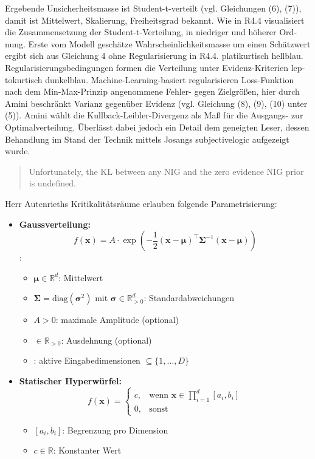 \begin{otherlanguage}{ngerman}
Ergebende Unsicherheitsmasse ist Student-t-verteilt (vgl. Gleichungen (6), (7)), damit ist Mittelwert, Skalierung, Freiheitsgrad bekannt. Wie in R4.4 visualisiert die Zusammensetzung der Student-t-Verteilung, in \glqq niedriger \grqq und \glqq höherer \grqq Ordnung. Erste vom Modell geschätze Wahrscheinlichkeitsmasse um einen Schätzwert ergibt sich aus Gleichung 4 ohne Regularisierung in R4.4. platikurtisch hellblau. Regularisierungsbedingungen formen die Verteilung unter Evidenz-Kriterien leptokurtisch dunkelblau. Machine-Learning-basiert regularisieren Loss-Funktion nach dem Min-Max-Prinzip angenommene Fehler- gegen Zielgrößen, hier durch Amini beschränkt Varianz gegenüber Evidenz (vgl. Gleichung (8), (9), (10) unter (5)). Amini wählt die Kullback-Leibler-Divergenz als Maß für die Ausgangs- zur Optimalverteilung. Überlässt dabei jedoch ein Detail dem geneigten Leser, dessen Behandlung im Stand der Technik mittels Josangs \gls{subjectivelogic} aufgezeigt wurde.

\begin{quote}
  Unfortunately, the KL between any NIG and the zero evidence NIG prior is undefined.
\end{quote}

Herr Autenrieths Kritikalitätsräume erlauben folgende Parametrisierung: 

\begin{itemize}
  \item \textbf{Gaussverteilung:}
    \[
    f(\mathbf{x}) = A \cdot \exp\left(-\frac{1}{2} (\mathbf{x} - \boldsymbol{\mu})^\top \mathbf{\Sigma}^{-1} (\mathbf{x} - \boldsymbol{\mu}) \right)
    \]
    :
    \begin{itemize}
      \item $\boldsymbol{\mu} \in \mathbb{R}^d$: Mittelwert
      \item $\mathbf{\Sigma} = \mathrm{diag}(\boldsymbol{\sigma}^2)$ mit $\boldsymbol{\sigma} \in \mathbb{R}_{>0}^d$: Standardabweichungen
      \item $A > 0$: maximale Amplitude (optional)
      \item {} $\in \mathbb{R}_{>0}$: Ausdehnung (optional)
      \item {}: aktive Eingabedimensionen $\subseteq \{1, \dots, D\}$
    \end{itemize}

  \item \textbf{Statischer Hyperwürfel:}
    \[
    f(\mathbf{x}) =
    \begin{cases}
      c, & \text{wenn } \mathbf{x} \in \prod_{i=1}^d [a_i, b_i] \\
      0, & \text{sonst}
    \end{cases}
    \]
    \begin{itemize}
      \item $[a_i, b_i]$: Begrenzung pro Dimension
      \item $c \in \mathbb{R}$: Konstanter Wert
    \end{itemize}


\end{itemize}
\end{otherlanguage}
